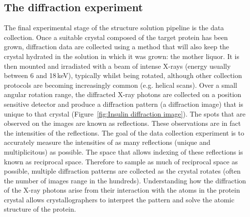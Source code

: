     \subsection{The diffraction experiment}
    \label{sub:The diffraction experiment}
        The final experimental stage of the structure solution pipeline is the data collection.
        Once a suitable crystal composed of the target protein has been grown, diffraction data are collected using a method that will also keep the crystal hydrated in the solution in which it was grown: the mother liquor.
        It is then mounted and irradiated with a beam of intense X-rays (energy usually between 6 and 18\,keV), typically whilst being rotated, although other collection protocols are becoming increasingly common (e.g. helical scans).
        Over a small angular rotation range, the diffracted X-ray photons are collected on a position sensitive detector and produce a diffraction pattern (a diffraction image) that is unique to that crystal (Figure~\ref{fig:Insulin diffraction image}).
        The spots that are observed on the images are known as reflections. These observations are in fact the intensities of the reflections.
        The goal of the data collection experiment is to accurately measure the intensities of as many reflections (unique and multiplicitous) as possible.
        The space that allows indexing of these reflections is known as reciprocal space.
        Therefore to sample as much of reciprocal space as possible, multiple diffraction patterns are collected as the crystal rotates (often the number of images range in the hundreds).
        Understanding how the diffraction of the X-ray photons arise from their interaction with the atoms in the protein crystal allows crystallographers to interpret the pattern and solve the atomic structure of the protein.
